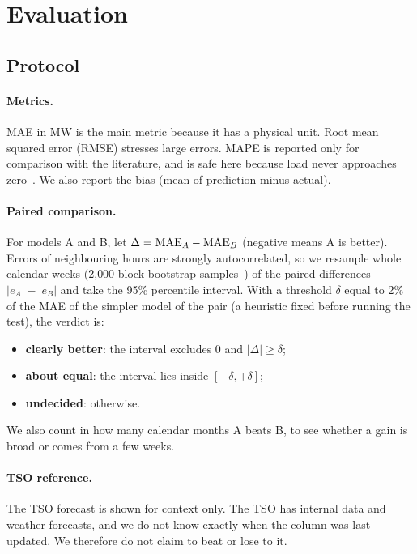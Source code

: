 \section{Evaluation}
\label{sec:evaluation}

\subsection{Protocol}
\label{sec:protocol}

\paragraph{Metrics.} MAE in MW is the main metric because it has a physical unit. Root mean squared error (RMSE) stresses
large errors. MAPE is reported only for comparison with the literature, and is safe here because load
never approaches zero~\cite{hyndman2021fpp3}. We also report the bias (mean of prediction minus
actual).

\paragraph{Paired comparison.} For models A and B, let $\Delta=\mathrm{MAE}_A-\mathrm{MAE}_B$ (negative means A is
better). Errors of neighbouring hours are strongly autocorrelated, so we resample whole calendar
weeks (2{,}000 block-bootstrap samples~\cite{kunsch1989jackknife}) of the paired differences
$|e_A|-|e_B|$ and take the 95\% percentile interval. With a threshold $\delta$ equal to 2\% of the MAE
of the simpler model of the pair (a heuristic fixed before running the test), the verdict is:
\begin{itemize}
  \item \textbf{clearly better}: the interval excludes 0 and $|\Delta|\ge\delta$;
  \item \textbf{about equal}: the interval lies inside $[-\delta,+\delta]$;
  \item \textbf{undecided}: otherwise.
\end{itemize}
We also count in how many calendar months A beats B, to see whether a gain is broad or comes from a
few weeks.

\paragraph{TSO reference.} The TSO forecast is shown for context only. The TSO has internal data and
weather forecasts, and we do not know exactly when the column was last updated. We therefore do not
claim to beat or lose to it.

